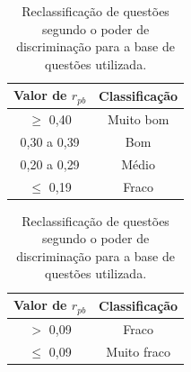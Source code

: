 \documentclass[12pt]{article}
\begin{document}
\begin{table}[!h]
    \centering
    \begin{minipage}[b]{0.52 \textwidth}
        \centering
        \begin{small}
        \caption{Classificação de questões segundo o poder de discriminação. Fonte: \cite{enade2021}}
        \label{tab:discriminacao_inep}
        \begin{tabular}{cc}
            \toprule
            \textbf{Valor de $r_{pb}$} & \textbf{Classificação} \\
            \toprule
            $\ge$ 0{,}40 & Muito bom \\
            0{,}30 a 0{,}39 & Bom \\
            0{,}20 a 0{,}29 & Médio \\
            $\le$ 0{,}19 & Fraco \\
            \bottomrule
        \end{tabular}
        \end{small}
    \end{minipage}
    \hfill
    \begin{minipage}[b]{0.45\textwidth}
        \centering
        \begin{small}
        \caption{Reclassificação de questões segundo o poder de discriminação para a base de questões utilizada.}
        \label{tab:discriminacao_prog}
        \begin{tabular}{cc}
            \toprule
            \textbf{Valor de $r_{pb}$} & \textbf{Classificação} \\
            \toprule
            $>$ 0{,}09 & Fraco \\
            $\le$ 0{,}09 & Muito fraco \\
            \bottomrule
        \end{tabular}
        \end{small}
    \end{minipage}
\end{table}

\end{document}
